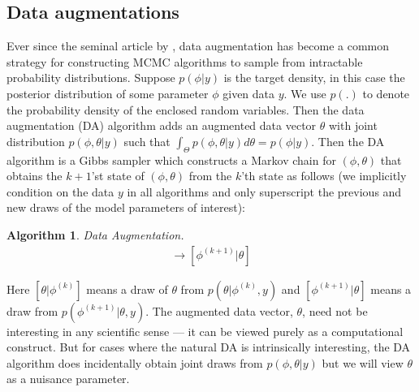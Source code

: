 \documentclass{article}
\newtheorem{alg}{Algorithm}
\begin{document}
\subsection{Data augmentations}
Ever since the seminal article by \citet{tanner1987calculation}, data augmentation has become a common strategy for constructing MCMC algorithms to sample from intractable probability distributions. Suppose $p(\phi|y)$ is the target density, in this case the posterior distribution of some parameter $\phi$ given data $y$. We use $p(.)$ to denote the probability density of the enclosed random variables. Then the data augmentation (DA) algorithm adds an augmented data vector $\theta$ with joint distribution $p(\phi,\theta|y)$ such that $\int_{\Theta}p(\phi,\theta|y)d\theta = p(\phi|y)$. Then the DA algorithm is a Gibbs sampler which constructs a Markov chain for $(\phi,\theta)$ that obtains the $k+1$'st state of $(\phi,\theta)$ from the $k$'th state as follows (we implicitly condition on the data $y$ in all algorithms and only superscript the previous and new draws of the model parameters of interest):
\begin{alg}Data Augmentation.\label{alg:DAintro}
  \begin{align*}
  [\theta|\phi^{(k)}] \to [\phi^{(k+1)}|\theta]
\end{align*}
\end{alg}
Here $[\theta|\phi^{(k)}]$ means a draw of $\theta$ from $p(\theta|\phi^{(k)},y)$ and $[\phi^{(k+1)}|\theta]$ means a draw from $p(\phi^{(k+1)}|\theta,y)$. The augmented data vector, $\theta$, need not be interesting in any scientific sense --- it can be viewed purely as a computational construct. But for cases where the natural DA is intrinsically interesting, the DA algorithm does incidentally obtain joint draws from $p(\phi,\theta|y)$ but we will view $\theta$ as a nuisance parameter.
\end{document}
